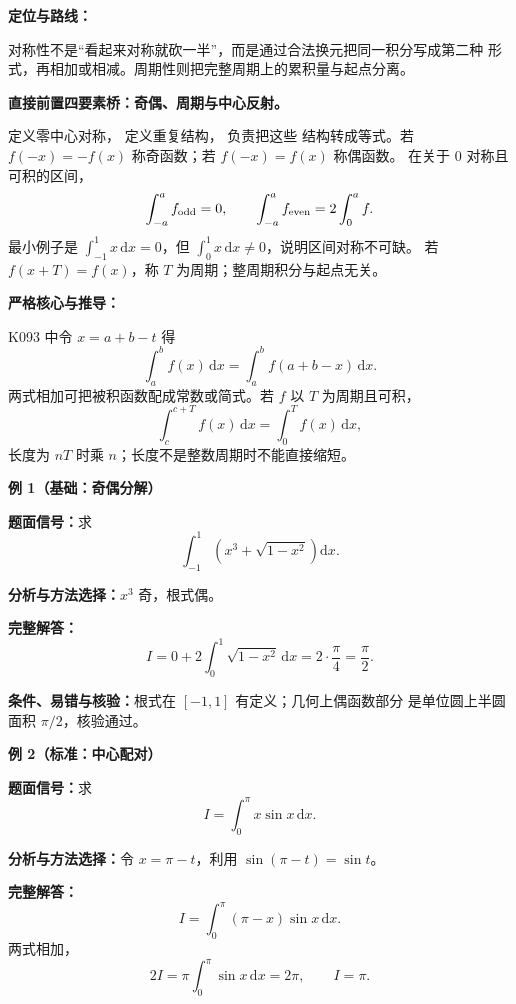 
\par

\begin{knowledgeBox}
\textbf{定位与路线：}

对称性不是“看起来对称就砍一半”，而是通过合法换元把同一积分写成第二种
形式，再相加或相减。周期性则把完整周期上的累积量与起点分离。

\textbf{直接前置四要素桥：奇偶、周期与中心反射。}

定义零中心对称，
定义重复结构，
负责把这些
结构转成等式。若 \(f(-x)=-f(x)\) 称奇函数；若
\(f(-x)=f(x)\) 称偶函数。
在关于 \(0\) 对称且可积的区间，
\[
\int_{-a}^a f_{\rm odd}=0,\qquad
\int_{-a}^a f_{\rm even}=2\int_0^a f.
\]
最小例子是 \(\int_{-1}^1x\,\mathrm dx=0\)，但
\(\int_0^1x\,\mathrm dx\ne0\)，说明区间对称不可缺。
若 \(f(x+T)=f(x)\)，称 \(T\) 为周期；整周期积分与起点无关。

\textbf{严格核心与推导：}

K093 中令 \(x=a+b-t\) 得
\[
\boxed{\int_a^bf(x)\,\mathrm dx
=\int_a^bf(a+b-x)\,\mathrm dx.}
\]
两式相加可把被积函数配成常数或简式。若 \(f\) 以 \(T\) 为周期且可积，
\[
\int_c^{c+T}f(x)\,\mathrm dx=\int_0^Tf(x)\,\mathrm dx,
\]
长度为 \(nT\) 时乘 \(n\)；长度不是整数周期时不能直接缩短。

\textbf{例 1（基础：奇偶分解）}

\textbf{题面信号：}求
\[
\int_{-1}^{1}\left(x^3+\sqrt{1-x^2}\right)\mathrm dx.
\]

\textbf{分析与方法选择：}\(x^3\) 奇，根式偶。

\textbf{完整解答：}
\[
I=0+2\int_0^1\sqrt{1-x^2}\,\mathrm dx
=2\cdot\frac{\pi}{4}=\frac\pi2.
\]

\textbf{条件、易错与核验：}根式在 \([-1,1]\) 有定义；几何上偶函数部分
是单位圆上半圆面积 \(\pi/2\)，核验通过。

\textbf{例 2（标准：中心配对）}

\textbf{题面信号：}求
\[
I=\int_0^\pi x\sin x\,\mathrm dx.
\]

\textbf{分析与方法选择：}令 \(x=\pi-t\)，利用
\(\sin(\pi-t)=\sin t\)。

\textbf{完整解答：}
\[
I=\int_0^\pi(\pi-x)\sin x\,\mathrm dx.
\]
两式相加，
\[
2I=\pi\int_0^\pi\sin x\,\mathrm dx=2\pi,
\qquad I=\pi.
\]


\end{knowledgeBox}
